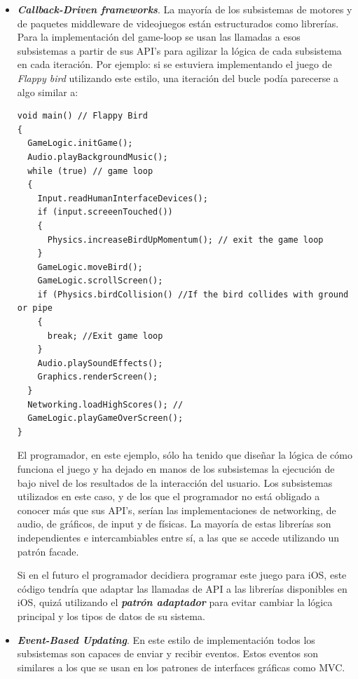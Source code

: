 \documentclass[a4paper,12pt]{report}
\begin{document}
	\begin{itemize}
		\item \textbf{\textit{Callback-Driven frameworks}}. La mayoría de los subsistemas de motores y de paquetes middleware de videojuegos están estructurados como librerías. Para la implementación del game-loop se usan las llamadas a esos subsistemas a partir de sus API's para agilizar la lógica de cada subsistema en cada iteración. Por ejemplo: si se estuviera implementando el juego de \textit{Flappy bird} utilizando este estilo, una iteración del bucle podía parecerse a algo similar a:
		
		\begin{lstlisting}[style=C, numbers=none]
void main() // Flappy Bird
{
  GameLogic.initGame();
  Audio.playBackgroundMusic();
  while (true) // game loop
  {
    Input.readHumanInterfaceDevices();
    if (input.screeenTouched())
    {
      Physics.increaseBirdUpMomentum(); // exit the game loop
    }
    GameLogic.moveBird();
    GameLogic.scrollScreen();
    if (Physics.birdCollision() //If the bird collides with ground or pipe
    {
      break; //Exit game loop
    }
    Audio.playSoundEffects();
    Graphics.renderScreen();
  }
  Networking.loadHighScores(); //
  GameLogic.playGameOverScreen();
}
		\end{lstlisting}
		
		
		El programador, en este ejemplo, sólo ha tenido que diseñar la lógica de cómo funciona el juego y ha dejado en manos de los subsistemas la ejecución de bajo nivel de los resultados de la interacción del usuario. Los subsistemas utilizados en este caso, y de los que el programador no está obligado a conocer más que sus API's, serían las implementaciones de networking, de audio, de gráficos, de input y de físicas. La mayoría de estas librerías son independientes e intercambiables entre sí, a las que se accede utilizando un patrón facade.
		
		Si en el futuro el programador decidiera programar este juego para iOS, este código tendría que adaptar las llamadas de API a las librerías disponibles en iOS, quizá utilizando el \textit{\textbf{patrón adaptador}} para evitar cambiar la lógica principal y los tipos de datos de su sistema.	
		
		\item \textit{\textbf{Event-Based Updating}}. En este estilo de implementación todos los subsistemas son capaces de enviar y recibir eventos. Estos eventos son similares a los que se usan en los patrones de interfaces gráficas como MVC. 
		

\end{itemize}
\end{document}
